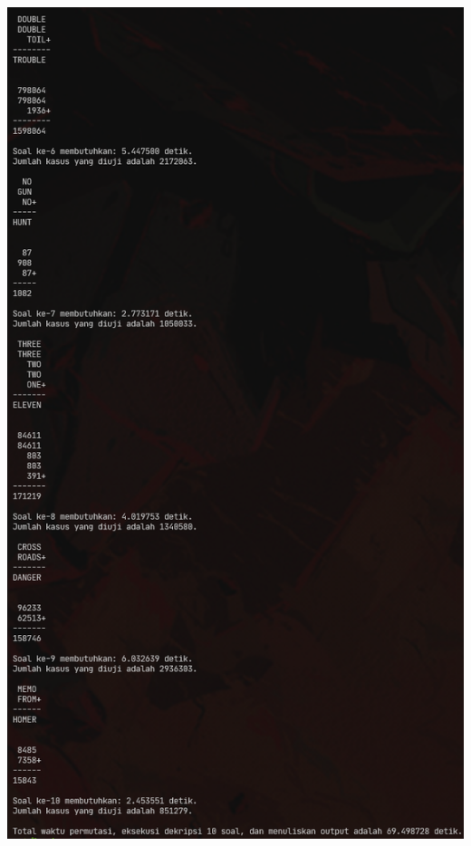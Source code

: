 \documentclass{article}
\let\origfigure\figure
\let\endorigfigure\endfigure
\renewenvironment{figure}[1][2] {
    \expandafter\origfigure\expandafter[H]
} {
    \endorigfigure
}
\begin{document}
\begin{figure}
  \includegraphics[scale = 0.9]{stima-ss-2.png}
  \caption{Luaran program dekripsi untuk soal 6 sampai 10}
\end{figure}
\end{document}
